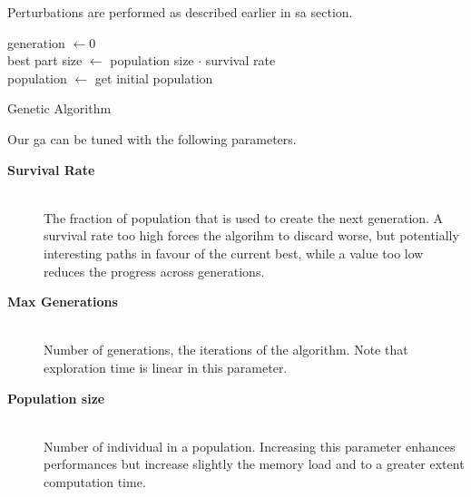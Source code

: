 \documentclass[12pt,journal,draftclsnofoot,onecolumn]{IEEEtran}
\begin{document}
Perturbations are performed as described earlier in \gls{sa} section.

\begin{algorithm}
	generation $\gets 0$\\
	best part size $\gets$ population size $\cdot$ survival rate\\
	population $\gets$ get initial population\\
	\caption{Genetic Algorithm}\label{algo:GA}
\end{algorithm}

Our \gls{ga} can be tuned with the following parameters.
\begin{description}
	\item[\textbf{Survival Rate}] \hfill \\
	The fraction of population that is used to create the next generation. A survival rate too high forces the algorihm to discard worse, but potentially interesting paths in favour of the current best, while a value too low reduces the progress across generations.
	\item[\textbf{Max Generations}] \hfill \\
	Number of generations, the iterations of the algorithm. Note that exploration time is linear in this parameter.
	\item[\textbf{Population size}] \hfill \\
	Number of individual in a population. Increasing this parameter enhances performances but increase slightly the memory load and to a greater extent computation time.
\end{description}
\end{document}
